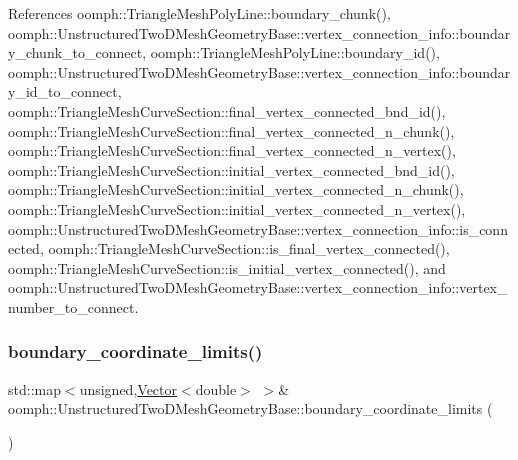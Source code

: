 References oomph\+::\+Triangle\+Mesh\+Poly\+Line\+::boundary\+\_\+chunk(), oomph\+::\+Unstructured\+Two\+D\+Mesh\+Geometry\+Base\+::vertex\+\_\+connection\+\_\+info\+::boundary\+\_\+chunk\+\_\+to\+\_\+connect, oomph\+::\+Triangle\+Mesh\+Poly\+Line\+::boundary\+\_\+id(), oomph\+::\+Unstructured\+Two\+D\+Mesh\+Geometry\+Base\+::vertex\+\_\+connection\+\_\+info\+::boundary\+\_\+id\+\_\+to\+\_\+connect, oomph\+::\+Triangle\+Mesh\+Curve\+Section\+::final\+\_\+vertex\+\_\+connected\+\_\+bnd\+\_\+id(), oomph\+::\+Triangle\+Mesh\+Curve\+Section\+::final\+\_\+vertex\+\_\+connected\+\_\+n\+\_\+chunk(), oomph\+::\+Triangle\+Mesh\+Curve\+Section\+::final\+\_\+vertex\+\_\+connected\+\_\+n\+\_\+vertex(), oomph\+::\+Triangle\+Mesh\+Curve\+Section\+::initial\+\_\+vertex\+\_\+connected\+\_\+bnd\+\_\+id(), oomph\+::\+Triangle\+Mesh\+Curve\+Section\+::initial\+\_\+vertex\+\_\+connected\+\_\+n\+\_\+chunk(), oomph\+::\+Triangle\+Mesh\+Curve\+Section\+::initial\+\_\+vertex\+\_\+connected\+\_\+n\+\_\+vertex(), oomph\+::\+Unstructured\+Two\+D\+Mesh\+Geometry\+Base\+::vertex\+\_\+connection\+\_\+info\+::is\+\_\+connected, oomph\+::\+Triangle\+Mesh\+Curve\+Section\+::is\+\_\+final\+\_\+vertex\+\_\+connected(), oomph\+::\+Triangle\+Mesh\+Curve\+Section\+::is\+\_\+initial\+\_\+vertex\+\_\+connected(), and oomph\+::\+Unstructured\+Two\+D\+Mesh\+Geometry\+Base\+::vertex\+\_\+connection\+\_\+info\+::vertex\+\_\+number\+\_\+to\+\_\+connect.

\mbox{\label{classoomph_1_1UnstructuredTwoDMeshGeometryBase_a020d5b78ac82fbc04e131f8ba3eea638}} 
\subsubsection{\texorpdfstring{boundary\+\_\+coordinate\+\_\+limits()}{boundary\_coordinate\_limits()}\hspace{0.1cm}{\footnotesize\ttfamily [1/2]}}
{\footnotesize\ttfamily std\+::map$<$unsigned,\hyperlink{classoomph_1_1Vector}{Vector}$<$double$>$ $>$\& oomph\+::\+Unstructured\+Two\+D\+Mesh\+Geometry\+Base\+::boundary\+\_\+coordinate\+\_\+limits (\begin{DoxyParamCaption}{ }\end{DoxyParamCaption})\hspace{0.3cm}{\ttfamily [inline]}}



